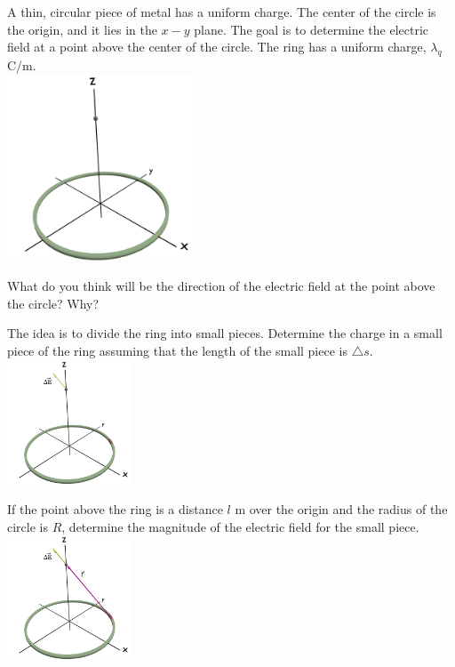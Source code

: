 \begin{problem}
  \item  A thin, circular piece of metal has a uniform charge. The center of the circle is the origin,
        and it lies in the $x-y$ plane. The goal is to determine the electric field at a point above the
        center of the circle. The ring has a uniform charge, $\lambda_q$ C/m. \\
        \includegraphics[width=15em]{blender/ringCharge}
  \begin{subproblem}
    \item What do you think will be the direction of the electric field at the point above the circle? Why?
             \vspace{3em}
   \item The idea is to divide the ring into small pieces. Determine the charge in a small piece of the ring
       assuming that the length of the small piece is $\triangle s$. \\
           \includegraphics[width=10em]{blender/ringCharge-deltaE}

    \item If the point above the ring is a distance $l$ m over the origin and the radius of the circle is $R$,
      determine the magnitude of the electric field for the small piece. \\
        \includegraphics[width=10em]{blender/ringCharge-distance}


\end{subproblem}
\end{problem}
